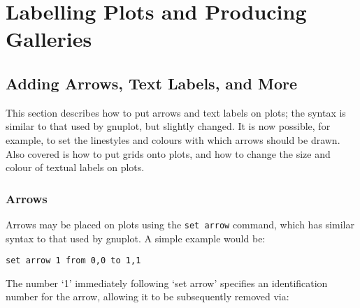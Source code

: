 %
%
%
%
%



\chapter{Labelling Plots and Producing Galleries}

\section{Adding Arrows, Text Labels, and More}

This section describes how to put arrows and text labels on plots; the syntax
is similar to that used by gnuplot, but slightly changed. It is now possible,
for example, to set the linestyles and colours with which arrows should be
drawn.  Also covered is how to put grids onto plots, and how to change the size
and colour of textual labels on plots.

\subsection{Arrows}

\label{set_arrow} Arrows may be placed on plots using the \texttt{set arrow} command,
which has similar syntax to that used by gnuplot. A simple example would be:

\begin{verbatim}
set arrow 1 from 0,0 to 1,1
\end{verbatim}

\noindent The number `1' immediately following `set arrow' specifies an identification
number for the arrow, allowing it to be subsequently removed via:

